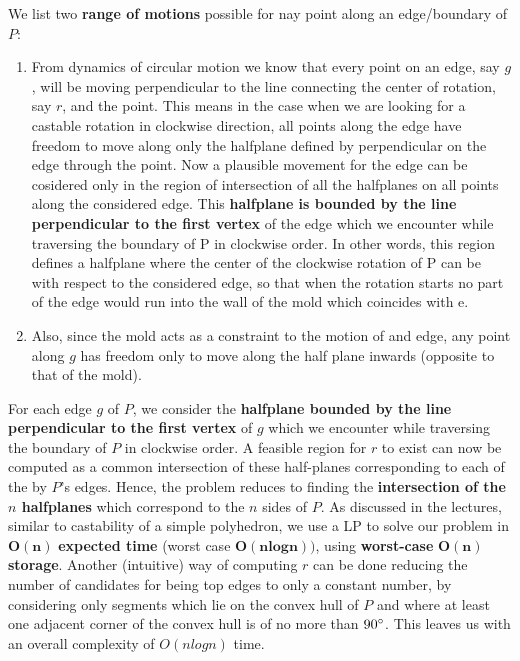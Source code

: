 	We list two \textbf{range of motions} possible for nay point along an edge/boundary of $P$:
	\begin{enumerate}
		\item From dynamics of circular motion we know that every point on an edge, say $g$, will be moving perpendicular to the line connecting the center of rotation, say $r$, and the point. This means in the case when we are looking for a castable rotation in clockwise direction, all points along the edge have freedom to move along only the halfplane defined by perpendicular on the edge through the point. Now a plausible movement for the edge can be cosidered only in the region of intersection of all the halfplanes on all points along the considered edge. This \textbf{halfplane is bounded by the line perpendicular to the first vertex} of the edge which we encounter while traversing the boundary of P in clockwise order. In other words, this region defines a halfplane where the center of the clockwise rotation of P can be with respect to the considered edge, so that when the rotation starts no part of the edge would run into the wall of the mold which coincides with e. 
		\item Also, since the mold acts as a  constraint to the motion of and edge, any point along $g$ has freedom only to move along the half plane inwards (opposite to that of the mold).
	\end{enumerate}
	
	For each edge $g$ of $P$, we consider the \textbf{halfplane bounded by the line perpendicular to the first vertex} of $g$ which we encounter while traversing the boundary of $P$ in clockwise order. A feasible region for $r$ to exist can now be computed as a  common intersection of these half-planes corresponding to each of the by $P$'s edges. Hence, the problem reduces to finding the \textbf{intersection of the $n$ halfplanes} which correspond to the $n$ sides of $P$.  As discussed in the lectures, similar to castability of a simple polyhedron, we use a LP to solve our problem in $\bm{O(n)}$ \textbf{expected time} (worst case $\bm{O(nlogn)})$, using \textbf{worst-case} $\bm{O(n)}$ \textbf{storage}. 
	Another (intuitive) way of computing $r$ can be done reducing the number of candidates for being top edges to only a constant number, by considering only segments which lie on the convex hull of $P$ and where at least one adjacent corner of the convex hull is of no more than $90 \degree$. This leaves us with an overall complexity of $O(nlogn)$ time.


